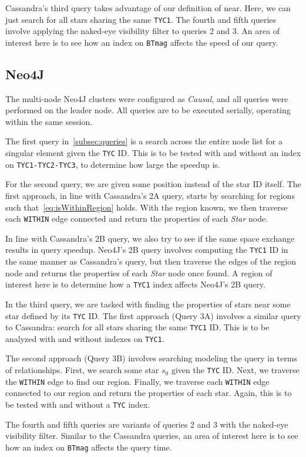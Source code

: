 Cassandra's third query takes advantage of our definition of near.
Here, we can just search for all stars sharing the same \texttt{TYC1}.
The fourth and fifth queries involve applying the naked-eye visibility filter to queries 2 and 3.
An area of interest here is to see how an index on \texttt{BTmag} affects the speed of our query.

\subsection{Neo4J}\label{subsec:neo4j}
The multi-node Neo4J clusters were configured as \textit{Causal}, and all queries were performed on
the leader node.
All queries are to be executed serially, operating within the same session.

The first query in~\autoref{subsec:queries} is a search across the entire node list for a singular element given the
\texttt{TYC} ID\@.
This is to be tested with and without an index on \texttt{TYC1-TYC2-TYC3}, to determine how large the speedup is.

For the second query, we are given some position instead of the star ID itself.
The first approach, in line with Cassandra's 2A query, starts by searching for regions such
that~\autoref{eq:isWithinRegion} holds.
With the region known, we then traverse each \texttt{WITHIN} edge connected and return the properties of each
\textit{Star} node.

In line with Cassandra's 2B query, we also try to see if the same space exchange results in query speedup.
Neo4J's 2B query involves computing the \texttt{TYC1} ID in the same manner as Cassandra's query, but
then traverse the edges of the region node and returns the properties of each \textit{Star} node once found.
A region of interest here is to determine how a \texttt{TYC1} index affects Neo4J's 2B query.

In the third query, we are tasked with finding the properties of stars near some star defined by its \texttt{TYC} ID\@.
The first approach (Query 3A) involves a similar query to Cassandra: search for all stars sharing the same
\texttt{TYC1} ID\@.
This is to be analyzed with and without indexes on \texttt{TYC1}.

The second approach (Query 3B) involves searching modeling the query in terms of relationships.
First, we search some star $s_0$ given the \texttt{TYC} ID\@.
Next, we traverse the \texttt{WITHIN} edge to find our region.
Finally, we traverse each \texttt{WITHIN} edge connected to our region and return the properties of each star.
Again, this is to be tested with and without a \texttt{TYC} index.

The fourth and fifth queries are variants of queries 2 and 3 with the naked-eye visibility filter.
Similar to the Cassandra queries, an area of interest here is to see how an index on \texttt{BTmag} affects the
query time.
